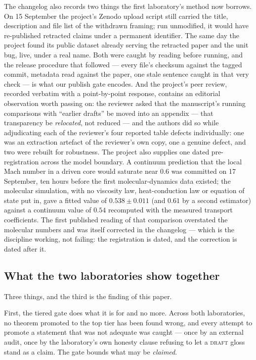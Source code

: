 \documentclass[11pt]{article}
\begin{document}
The changelog also records two things the first laboratory's method now borrows. On 15
September the project's Zenodo upload script still carried the title, description and file
list of the withdrawn framing; run unmodified, it would have re-published retracted claims under
a permanent identifier. The same day the project found its public dataset already serving the
retracted paper and the unit bug, live, under a real name. Both were caught by reading before
running, and the release procedure that followed --- every file's checksum against the tagged
commit, metadata read against the paper, one stale sentence caught in that very check --- is
what our publish gate encodes. And the project's peer review, recorded verbatim with a
point-by-point response, contains an editorial observation worth passing on: the reviewer
asked that the manuscript's running comparisons with ``earlier drafts'' be moved into an
appendix --- that transparency be \emph{relocated}, not reduced --- and the authors did so while
adjudicating each of the reviewer's four reported table defects individually: one was an
extraction artefact of the reviewer's own copy, one a genuine defect, and two were rebuilt for
robustness. The project also supplies one dated pre-registration across the model boundary. A
continuum prediction that the local Mach number in a driven core would saturate near $0.6$ was
committed on 17 September, ten hours before the first molecular-dynamics data existed; the
molecular simulation, with no viscosity law, heat-conduction law or equation of state put in,
gave a fitted value of $0.538\pm0.011$ (and $0.61$ by a second estimator) against a continuum
value of $0.54$ recomputed with the measured transport coefficients. The first published
reading of that comparison overstated the molecular numbers and was itself corrected in the
changelog --- which is the discipline working, not failing: the registration is dated, and the
correction is dated after it.

\subsection{What the two laboratories show together}

Three things, and the third is the finding of this paper.

First, the tiered gate does what it is for and no more. Across both laboratories, no theorem
promoted to the top tier has been found wrong, and every attempt to promote a statement that was
not adequate was caught --- once by an external audit, once by the laboratory's own honesty
clause refusing to let a \textsc{draft} gloss stand as a claim. The gate bounds what may be
\emph{claimed}.
\end{document}
